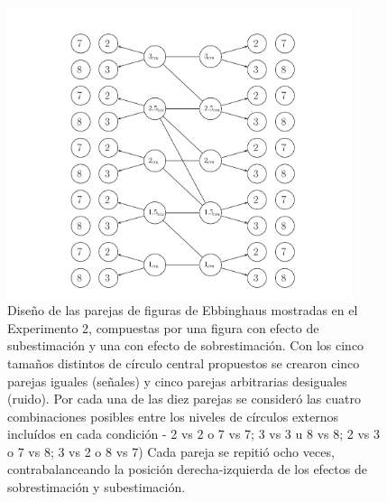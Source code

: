 \begin{itemize}
\begin{figure}[th]
\centering
\includegraphics[width=0.9\textwidth]{Figures/Estimulos_Experimento2} 
\decoRule
\caption[Diseño de Estimulos en el Experimento 2]{Diseño de las parejas de figuras de Ebbinghaus mostradas en el Experimento 2, compuestas por una figura con efecto de subestimación y una con efecto de sobrestimación. Con los cinco tamaños distintos de círculo central propuestos se crearon cinco parejas iguales (señales) y cinco parejas arbitrarias desiguales (ruido). Por cada una de las diez parejas se consideró las cuatro combinaciones posibles entre los niveles de círculos externos incluídos en cada condición - 2 vs 2 o 7 vs 7; 3 vs 3 u 8 vs 8; 2 vs 3 o 7 vs 8; 3 vs 2 o 8 vs 7) Cada pareja se repitió ocho veces, contrabalanceando la posición derecha-izquierda de los efectos de sobrestimación y subestimación.}
\label{fig:Exp_2}
\end{figure}
\end{itemize}


